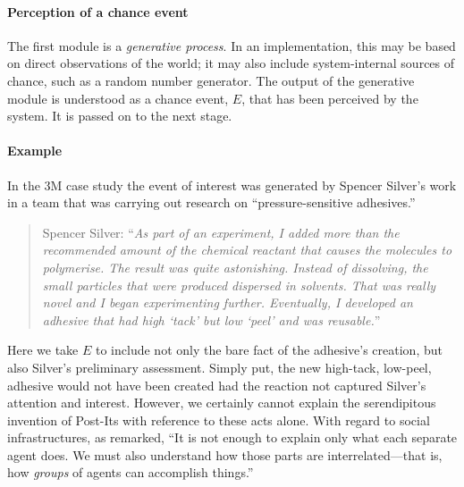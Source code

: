 \paragraph{Perception of a chance event}
The first module is a \emph{generative process}.  In an
implementation, this may be based on direct observations of the
world; it may also include system-internal sources of chance,
such as a random number generator.  The output of the generative
module is understood as a chance event, $E$, that has been perceived
by the system. It is passed on to the next stage.

\paragraph{\textbf{\upshape Example}}
In the 3M case study the event of interest was generated by Spencer
Silver's work in a team that was carrying out research on
``pressure-sensitive adhesives.''
\begin{quote}
Spencer Silver: ``\emph{As part of an experiment, I added more than
  the recommended amount of the chemical reactant that causes the
  molecules to polymerise. The result was quite astonishing. Instead
  of dissolving, the small particles that were produced dispersed in
  solvents. That was really novel and I began experimenting
  further. Eventually, I developed an adhesive that had high `tack'
  but low `peel' and was reusable.}''
\end{quote}
Here we take $E$ to include not only the bare fact of the adhesive's
creation, but also Silver's preliminary assessment.  Simply put, the
new high-tack, low-peel, adhesive would not have been created had the
reaction not captured Silver's attention and interest.  However, we
certainly cannot explain the serendipitous invention of
Post-Its\textsuperscript{\textregistered} with reference to these acts
alone.  With regard to social infrastructures, as
\citet[p.~23]{society-of-mind} remarked, ``It is not enough to explain
only what each separate agent does.  We must also understand how those
parts are interrelated---that is, how \emph{groups} of agents can
accomplish things.''

